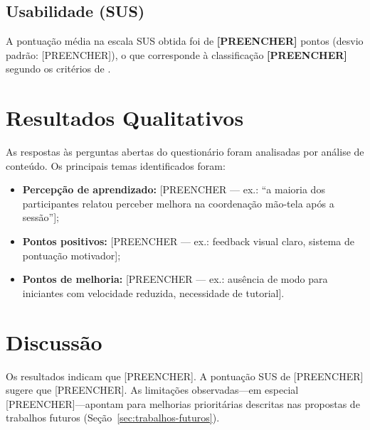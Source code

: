 \documentclass[
  12pt,
  openright,
  twoside,
  a4paper,
  english,
  brazil
]{abntex2}
\begin{document}
\subsection{Usabilidade (SUS)}

A pontuação média na escala SUS obtida foi de
\textbf{[PREENCHER]} pontos (desvio padrão: [PREENCHER]),
o que corresponde à classificação \textbf{[PREENCHER]}
segundo os critérios de \textcite{brooke1996}.


\section{Resultados Qualitativos}

As respostas às perguntas abertas do questionário foram analisadas por
análise de conteúdo. Os principais temas identificados foram:

\begin{itemize}
  \item \textbf{Percepção de aprendizado:} [PREENCHER --- ex.: ``a
        maioria dos participantes relatou perceber melhora na
        coordenação mão-tela após a sessão''];
  \item \textbf{Pontos positivos:} [PREENCHER --- ex.: feedback visual
        claro, sistema de pontuação motivador];
  \item \textbf{Pontos de melhoria:} [PREENCHER --- ex.: ausência de
        modo para iniciantes com velocidade reduzida, necessidade de
        tutorial].
\end{itemize}

\section{Discussão}

Os resultados indicam que [PREENCHER]. A pontuação SUS de [PREENCHER]
sugere que [PREENCHER]. As limitações observadas---em especial
[PREENCHER]---apontam para melhorias prioritárias descritas nas
propostas de trabalhos futuros (Seção~\ref{sec:trabalhos-futuros}).
\end{document}
